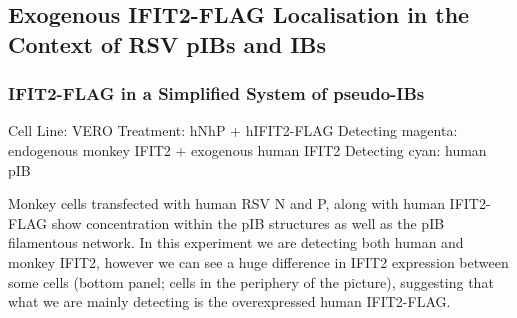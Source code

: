 \subsection{Exogenous IFIT2-FLAG Localisation in the Context of RSV pIBs and IBs} \label{subsec:Exogenous IFIT2-FLAG Localisation in the Context of RSV pIBs and IBs}
\subsubsection{IFIT2-FLAG in a Simplified System of pseudo-IBs} \label{IFIT2-FLAG in a Simplified System of pseudo-IBs}
Cell Line: VERO \newline
Treatment: hNhP + hIFIT2-FLAG \newline
Detecting magenta: endogenous monkey IFIT2 + exogenous human IFIT2 \newline
Detecting cyan: human pIB \newline

Monkey cells transfected with human RSV N and P, along with human IFIT2-FLAG show concentration within the pIB structures as well as the pIB filamentous network. In this experiment we are detecting both human and monkey IFIT2, however we can see a huge difference in IFIT2 expression between some cells (bottom panel; cells in the periphery of the picture), suggesting that what we are mainly detecting is the overexpressed human IFIT2-FLAG.

